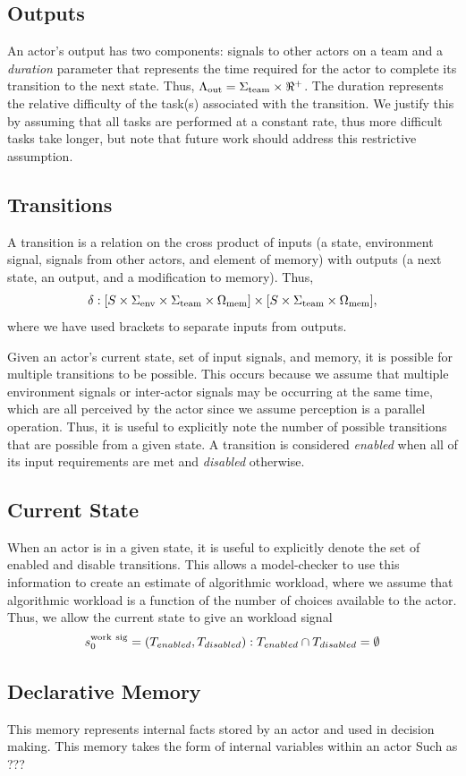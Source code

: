  \subsection{Outputs}
 An actor's output has two components: signals to other actors on a team and a {\em duration} parameter that represents the time required for the actor to complete its transition to the next state.  Thus, $\Lambda_{\rm out}=\Sigma_{\rm team} \times \Re^+$. The duration represents the relative difficulty of the
task(s) associated with the transition.  We justify this by assuming that
all tasks are performed at a constant rate, thus more difficult tasks take
longer, but note that future work should address this restrictive assumption.  
 
 \subsection{Transitions}
 
A transition is a relation on the cross product of inputs (a state, environment signal, signals from other actors, and element of memory)  with outputs (a next state, an output, and a modification to memory).  Thus,
\begin{equation}
 \delta:[S\times\Sigma_{\rm env}\times\Sigma_{\rm team}\times\Omega_{\rm mem}] \times [S\times \Sigma_{\rm team} \times \Omega_{\rm mem}], 
\end{equation} 
where we have used brackets to separate inputs from outputs.
 
Given an actor's current state, set of input signals, and memory, it is possible for multiple transitions to be possible.  This occurs because we assume that multiple environment signals or inter-actor signals may be occurring at the same time, which are all perceived by the actor since we assume perception is a parallel operation.  Thus, it is useful to explicitly note the number of possible transitions that are possible from a given state.   A transition is considered {\em enabled} when all of its input
requirements are met and {\em disabled} otherwise. 

\subsection{Current State}
When an actor is in a given state, it is useful to explicitly denote the set of enabled and disable transitions.  This allows a model-checker to use this information to create an estimate of algorithmic workload, where we assume that algorithmic workload is a function of the number of choices available to the actor.  Thus, we allow the current state to give an workload signal
 \begin{equation}
	s_0^{\rm work\  sig} = (T_{enabled}, T_{disabled}) : T_{enabled} \cap T_{disabled} = \emptyset
 \label{eq:state}
\end{equation}


\subsection{Declarative Memory }
This memory represents internal facts stored by an actor and used in decision
making.  This memory takes the form of internal variables within an actor {\sc Such as ???}

